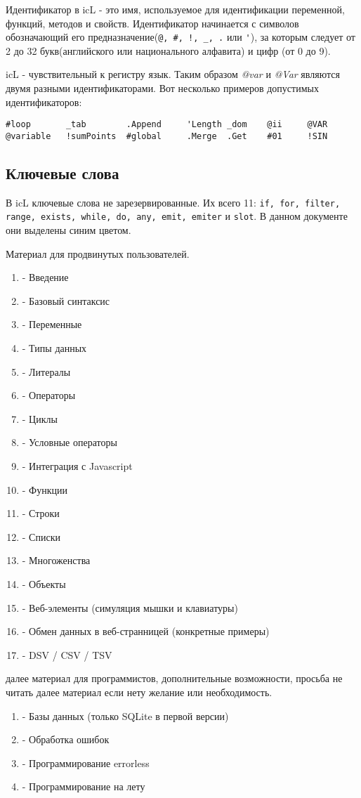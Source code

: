 \documentclass[a4paper, 14pt]{extarticle}
\begin{document}
	Идентификатор в icL - это имя, используемое для идентификации переменной, функций, методов и свойств. Идентификатор начинается с символов обозначающий его предназначение(\lstinline`@, #, !, _, .` или \lstinline`'`), за которым следует от 2 до 32 букв(английского или национального алфавита) и цифр (от 0 до 9).
	
	icL - чувствительный к регистру язык. Таким образом \textit{@var} и \textit{@Var} являются двумя разными идентификаторами. Вот несколько примеров допустимых идентификаторов:
	
	\begin{lstlisting}[numbers=none]
#loop		_tab		.Append		'Length	_dom	@ii 	@VAR
@variable	!sumPoints	#global		.Merge	.Get	#01		!SIN
	\end{lstlisting}
	
	\subsection{Ключевые слова}
	
	В icL ключевые слова не зарезервированные. Их всего 11: \lstinline`if, for, filter, range, exists, while, do, any, emit, emiter` и \lstinline`slot`. В данном документе они выделены синим цветом.
  
	\newpage
	{\color{red}Материал для продвинутых пользователей.}
  	
  	\begin{enumerate}
  	\item - Введение
  	\item - Базовый синтаксис
  	\item - Переменные
  	\item - Типы данных
  	\item - Литералы
  	\item - Операторы
  	\item - Циклы
  	\item - Условные операторы
  	\item - Интеграция с Javascript
  	\item - Функции
  	\item - Строки
  	\item - Списки
  	\item - Многоженства
  	\item - Объекты
  	\item - Веб-элементы (симуляция мышки и клавиатуры)
  	\item - Обмен данных в веб-странницей (конкретные примеры)
  	\item - DSV / CSV / TSV
  	\end{enumerate}
  	
  	{\color{red}далее материал для программистов, дополнительные возможности, просьба не читать далее материал если нету желание или необходимость.}
	
	\begin{enumerate}[resume]
  	\item - Базы данных (только SQLite в первой версии)
  	\item - Обработка ошибок
  	\item - Программирование errorless
  	\item - Программирование на лету
  	\end{enumerate}
	
\end{document}
